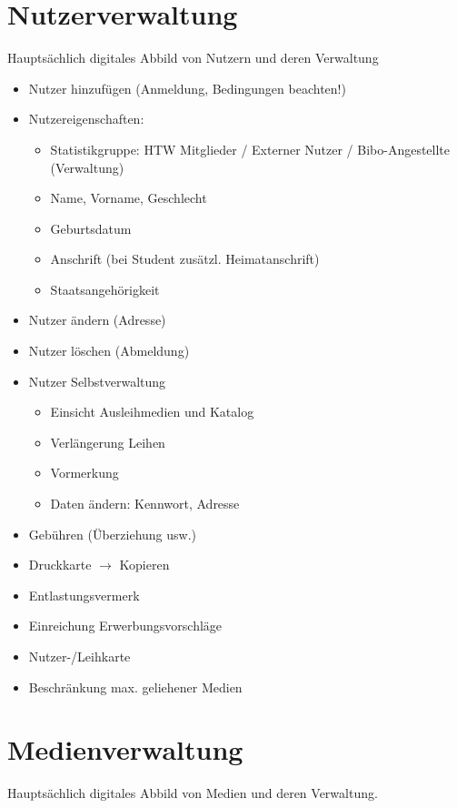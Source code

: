 \section{Nutzerverwaltung}
Hauptsächlich digitales Abbild von Nutzern und deren Verwaltung
\begin{itemize}
\item Nutzer hinzufügen (Anmeldung, Bedingungen beachten!)
\item Nutzereigenschaften:
\begin{itemize}
\item Statistikgruppe: HTW Mitglieder / Externer Nutzer / Bibo-Angestellte (Verwaltung)
\item Name, Vorname, Geschlecht
\item Geburtsdatum
\item Anschrift (bei Student zusätzl. Heimatanschrift)
\item Staatsangehörigkeit
\end{itemize}
\item Nutzer ändern (Adresse)
\item Nutzer löschen (Abmeldung)
\item Nutzer Selbstverwaltung 
\begin{itemize}
\item Einsicht Ausleihmedien und Katalog
\item Verlängerung Leihen
\item Vormerkung
\item Daten ändern: Kennwort, Adresse
\end{itemize}
\item Gebühren (Überziehung usw.)
\item Druckkarte $\to$ Kopieren
\item Entlastungsvermerk
\item Einreichung Erwerbungsvorschläge
\item Nutzer-/Leihkarte
\item Beschränkung max. geliehener Medien
\end{itemize}

\section{Medienverwaltung}
Hauptsächlich digitales Abbild von Medien und deren Verwaltung.

